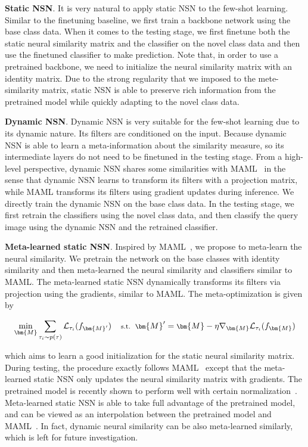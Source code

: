 \textbf{Static NSN}. It is very natural to apply static NSN to the few-shot learning. Similar to the finetuning baseline, we first train a backbone network using the base class data. When it comes to the testing stage, we first finetune both the static neural similarity matrix and the classifier on the novel class data and then use the finetuned classifier to make prediction. Note that, in order to use a pretrained backbone, we need to initialize the neural similarity matrix with an identity matrix. Due to the strong regularity that we imposed to the mete-similarity matrix, static NSN is able to preserve rich information from the pretrained model while quickly adapting to the novel class data. 
\par
\textbf{Dynamic NSN}. Dynamic NSN is very suitable for the few-shot learning due to its dynamic nature. Its filters are conditioned on the input. Because dynamic NSN is able to learn a meta-information about the similarity measure, so its intermediate layers do not need to be finetuned in the testing stage. From a high-level perspective, dynamic NSN shares some similarities with MAML~\cite{finn2017model} in the sense that dynamic NSN learns to transform its filters with a projection matrix, while MAML transforms its filters using gradient updates during inference. We directly train the dynamic NSN on the base class data. In the testing stage, we first retrain the classifiers using the novel class data, and then classify the query image using the dynamic NSN and the retrained classifier.
\par
\textbf{Meta-learned static NSN}. Inspired by MAML~\cite{finn2017model}, we propose to meta-learn the neural similarity. We pretrain the network on the base classes with identity similarity and then meta-learned the neural similarity and classifiers similar to MAML. The meta-learned static NSN dynamically transforms its filters via projection using the gradients, similar to MAML. The meta-optimization is given by

\begin{equation}
\footnotesize
    \min_{\bm{M}} \sum_{\tau_i\sim p(\tau)}\mathcal{L}_{\tau_i}(f_{\bm{M}'})
    \ \ \ \ \textnormal{s.t.}\ \ \bm{M}'=\bm{M}-\eta\nabla_{\bm{M}}\mathcal{L}_{\tau_i}(f_{\bm{M}}) 
\end{equation}

which aims to learn a good initialization for the static neural similarity matrix. During testing, the procedure exactly follows MAML~\cite{finn2017model} except that the meta-learned static NSN only updates the neural similarity matrix with gradients.  The pretrained model is recently shown to perform well with certain normalization~\cite{chen2018a}. Meta-learned static NSN is able to take full advantage of the pretrained model, and can be viewed as an interpolation between the pretrained model and MAML~\cite{finn2017model}. In fact, dynamic neural similarity can be also meta-learned similarly, which is left for future investigation.
\par

